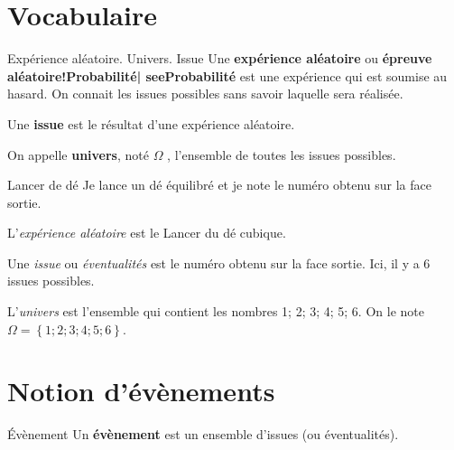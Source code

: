 \begin{pageCours} 

\section{Vocabulaire}



\begin{DefT}{Expérience aléatoire. Univers. Issue}
Une \textbf{expérience aléatoire} ou \textbf{épreuve aléatoire!Probabilité| see{Probabilité}} est une expérience qui est soumise au hasard. On connait les issues possibles sans savoir laquelle sera réalisée.

Une \textbf{issue} est le résultat d'une expérience aléatoire.

On appelle \textbf{univers}, noté $\Omega$ \index{$\Omega$}, l'ensemble de toutes les issues possibles.
\end{DefT}

\begin{ExT}{Lancer de dé}
Je lance un dé équilibré et je note le numéro obtenu sur la face sortie. 
\begin{description}
\item L'\textit{expérience aléatoire} est le Lancer du dé cubique.
\item Une \textit{issue}  ou \textit{éventualités}  est le numéro obtenu sur la face sortie. Ici, il y a 6 issues possibles.
\item L'\textit{univers} est l'ensemble qui contient les nombres 1; 2; 3; 4; 5; 6. On le note $\Omega = \left\lbrace  1;2;3;4;5;6\right\rbrace $.
\end{description}
\end{ExT}

 
\section{Notion d'évènements}

\begin{DefT}{Évènement}
Un \textbf{évènement} est un ensemble d'issues (ou éventualités).
\end{DefT}



\end{pageCours}
